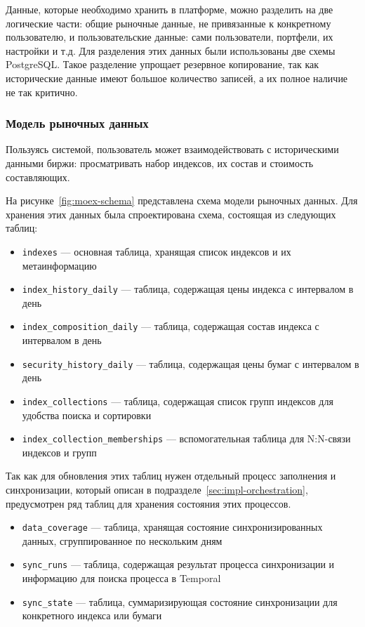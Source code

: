 \documentclass[14pt]{gost-7-32}
\begin{document}
Данные, которые необходимо хранить в платформе, можно разделить на две логические части: общие рыночные данные, не привязанные к конкретному пользователю, и пользовательские данные: сами пользователи, портфели, их настройки и т.д. Для разделения этих данных были использованы две схемы PostgreSQL. Такое разделение упрощает резервное копирование, так как исторические данные имеют большое количество записей, а их полное наличие не так критично.

\subsubsection{Модель рыночных данных}
\label{sec:design-market-data}

Пользуясь системой, пользователь может взаимодействовать с историческими данными биржи: просматривать набор индексов, их состав и стоимость составляющих.

На рисунке~\ref{fig:moex-schema} представлена схема модели рыночных данных.
Для хранения этих данных была спроектирована схема, состоящая из следующих таблиц:


\begin{itemize}
  \item \verb|indexes| --- основная таблица, хранящая список индексов и их метаинформацию
  \item \verb|index_history_daily| --- таблица, содержащая цены индекса с интервалом в день
  \item \verb|index_composition_daily| --- таблица, содержащая состав индекса с интервалом в день
  \item \verb|security_history_daily| --- таблица, содержащая цены бумаг с интервалом в день
  \item \verb|index_collections| --- таблица, содержащая список групп индексов для удобства поиска и сортировки
  \item \verb|index_collection_memberships| --- вспомогательная таблица для N:N-связи индексов и групп
\end{itemize}

Так как для обновления этих таблиц нужен отдельный процесс заполнения и синхронизации, который описан в подразделе~\ref{sec:impl-orchestration}, предусмотрен ряд таблиц для хранения состояния этих процессов.

\begin{itemize}
  \item \verb|data_coverage| --- таблица, хранящая состояние синхронизированных данных, сгруппированное по нескольким дням
  \item \verb|sync_runs| --- таблица, содержащая результат процесса синхронизации и информацию для поиска процесса в Temporal
  \item \verb|sync_state| --- таблица, суммаризирующая состояние синхронизации для конкретного индекса или бумаги
\end{itemize}
\end{document}
